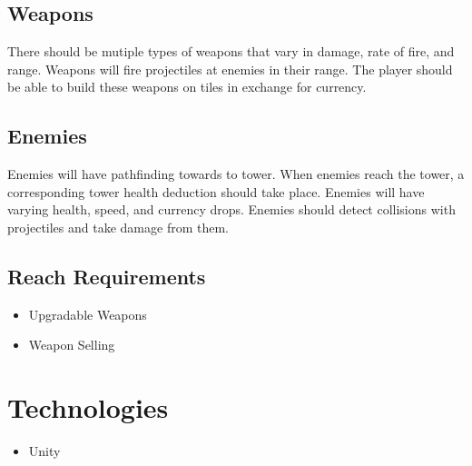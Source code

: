 \documentclass{article}
\begin{document}
\subsection{Weapons}

There should be mutiple types of weapons that vary in damage, rate of fire, and range. Weapons will fire projectiles at enemies in their range. The player should be able to build these weapons on tiles in exchange for currency.

\subsection{Enemies}

Enemies will have pathfinding towards to tower. When enemies reach the tower, a corresponding tower health deduction should take place. Enemies will have varying health, speed, and currency drops. Enemies should detect collisions with projectiles and take damage from them.

\subsection{Reach Requirements}

\begin{itemize}
    \item Upgradable Weapons
    \item Weapon Selling
\end{itemize}

\section{Technologies}
\label{sec:Technologies}

\begin{itemize}
    \item Unity
\end{itemize}
\end{document}
